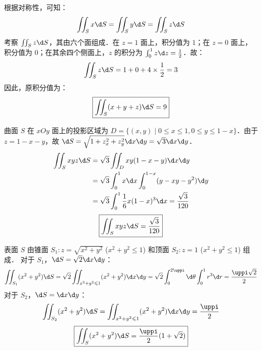 \begin{solution}

    根据对称性，可知：
    \begin{equation}
        \iint_{S} x \d S = \iint_{S} y \d S = \iint_{S} z \d S
    \end{equation}
    考察 $\iint_{S} z \d S$，其由六个面组成．在 $z=1$ 面上，积分值为 $1$；在 $z=0$ 面上，积分值为 $0$；在其余四个侧面上，$z$ 的积分为 $\int_{0}^{1} z \d z = \frac{1}{2}$．故：
    \begin{equation}
        \iint_{S} z \d S = 1 + 0 + 4 \times \frac{1}{2} = 3
    \end{equation}
    因此，原积分值为：
    \begin{equation}
        \boxed{\iint_{S}(x+y+z) \d S = 9}
    \end{equation}


    曲面 $S$ 在 $xOy$ 面上的投影区域为 $D = \{(x, y) \mid 0 \leqslant x \leqslant 1, 0 \leqslant y \leqslant 1-x\}$．由于 $z = 1-x-y$，故 $\d S = \sqrt{1 + z_x^2 + z_y^2} \d x \d y = \sqrt{3} \d x \d y$．
    \begin{equation}
        \begin{aligned}
            \iint_{S} x y z \d S & = \sqrt{3} \iint_{D} x y(1-x-y) \d x \d y                                \\
                                 & = \sqrt{3} \int_{0}^{1} x \d x \int_{0}^{1-x} (y - xy - y^2) \d y        \\
                                 & = \sqrt{3} \int_{0}^{1} \frac{1}{6} x(1-x)^3 \d x = \frac{\sqrt{3}}{120}
        \end{aligned}
    \end{equation}
    \begin{equation}
        \boxed{\iint_{S} x y z \d S = \frac{\sqrt{3}}{120}}
    \end{equation}


    表面 $S$ 由锥面 $S_1: z = \sqrt{x^2+y^2}$ ($x^2+y^2 \leqslant 1$) 和顶面 $S_2: z=1$ ($x^2+y^2 \leqslant 1$) 组成．
    对于 $S_1$，$\d S = \sqrt{2} \d x \d y$：
    \begin{equation}
        \iint_{S_1} (x^2+y^2) \d S = \sqrt{2} \iint_{x^2+y^2 \leqslant 1} (x^2+y^2) \d x \d y = \sqrt{2} \int_{0}^{2\uppi} \d \theta \int_{0}^{1} r^3 \d r = \frac{\uppi \sqrt{2}}{2}
    \end{equation}
    对于 $S_2$，$\d S = \d x \d y$：
    \begin{equation}
        \iint_{S_2} (x^2+y^2) \d S = \iint_{x^2+y^2 \leqslant 1} (x^2+y^2) \d x \d y = \frac{\uppi}{2}
    \end{equation}
    \begin{equation}
        \boxed{\iint_{S} (x^2+y^2) \d S = \frac{\uppi}{2}(1+\sqrt{2})}
    \end{equation}


\end{solution}
